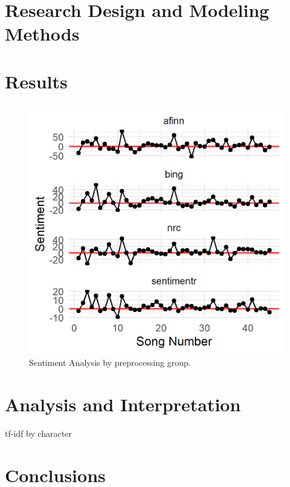 \documentclass{article}
\begin{document}
\section{Research Design and Modeling Methods}

\section{Results}

\begin{figure}[h]
    \caption{Sentiment Analysis by preprocessing group. \label{fig:sentiment}}
    \centering
    \includegraphics[width=0.2\paperwidth]{sentiment_by_stopwords.png}
\end{figure}



\section{Analysis and Interpretation}

\begin{table}
\caption{tf-idf by character}
\label{tab:tfidf}

\end{table}

\section{Conclusions}
\end{document}
